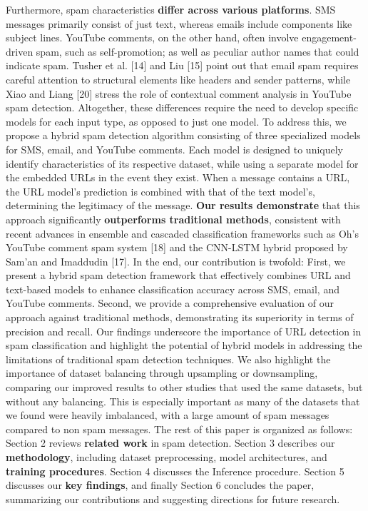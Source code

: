 \documentclass{article}
\begin{document}
\newline
\newline
Furthermore, spam characteristics \textbf{differ across various platforms}. SMS messages primarily consist of just text, whereas emails include components like subject lines. YouTube comments, on the other hand, often involve engagement-driven spam, such as self-promotion; as well as peculiar author names that could indicate spam. Tusher et al. [14] and Liu [15] point out that email spam requires careful attention to structural elements like headers and sender patterns, while Xiao and Liang [20] stress the role of contextual comment analysis in YouTube spam detection. Altogether, these differences require the need to develop specific models for each input type, as opposed to just one model. 
\newline
\newline
To address this, we propose a hybrid spam detection algorithm consisting of three specialized models for SMS, email, and YouTube comments. Each model is designed to uniquely identify characteristics of its respective dataset, while using a separate model for the embedded URLs in the event they exist. When a message contains a URL, the URL model’s prediction is combined with that of the text model’s, determining the legitimacy of the message. \textbf{Our results demonstrate} that this approach significantly \textbf{outperforms traditional methods}, consistent with recent advances in ensemble and cascaded classification frameworks such as Oh’s YouTube comment spam system [18] and the CNN-LSTM hybrid proposed by Sam’an and Imaddudin [17].
\newline
\newline
In the end, our contribution is twofold: First, we present a hybrid spam detection framework that effectively combines URL and text-based models to enhance classification accuracy across SMS, email, and YouTube comments. Second, we provide a comprehensive evaluation of our approach against traditional methods, demonstrating its superiority in terms of precision and recall. Our findings underscore the importance of URL detection in spam classification and highlight the potential of hybrid models in addressing the limitations of traditional spam detection techniques. We also highlight the importance of dataset balancing through upsampling or downsampling, comparing our improved results to other studies that used the same datasets, but without any balancing. This is especially important as many of the datasets that we found were heavily imbalanced, with a large amount of spam messages compared to non spam messages.
\newline
\newline
The rest of this paper is organized as follows: Section 2 reviews \textbf{related work} in spam detection. Section 3 describes our \textbf{methodology}, including dataset preprocessing, model architectures, and \textbf{training procedures}. Section 4 discusses the Inference procedure. Section 5 discusses our \textbf{key findings}, and finally Section 6 concludes the paper, summarizing our contributions and suggesting directions for future research.
\end{document}
